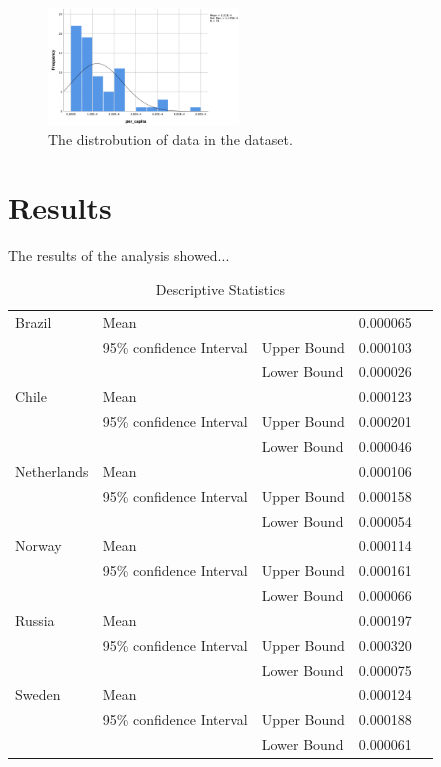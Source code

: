 \documentclass[conference]{IEEEtran}
\begin{document}
    \begin{figure}[h]
        \centering
        \includegraphics[width=0.45\textwidth]{skewed}
        \caption{The distrobution of data in the dataset.}
    \end{figure}

\section{Results}
The results of the analysis showed...
\newline

\begin{table}[ht]
    \centering
    \caption{Descriptive Statistics}
    \begin{tabular}{| l | l | lll |}
    \hline
     Brazil&  Mean&  &  0.000065&   \\
     &  95\% confidence Interval&  Upper Bound&  0.000103&   \\
     &  &  Lower Bound&  0.000026&   \\
     Chile&  Mean&  &  0.000123&   \\
     &  95\% confidence Interval&  Upper Bound&  0.000201&   \\
     &  &  Lower Bound&  0.000046&   \\
     Netherlands&  Mean&  &  0.000106&   \\
     &  95\% confidence Interval&  Upper Bound& 0.000158&   \\
     &  &  Lower Bound&  0.000054&   \\
     Norway&  Mean&  &  0.000114&   \\
     &  95\% confidence Interval&  Upper Bound&  0.000161&   \\
     &  &  Lower Bound&  0.000066&   \\
     Russia&  Mean&  &  0.000197&   \\
     &  95\% confidence Interval&  Upper Bound&  0.000320&   \\
     &  &  Lower Bound&  0.000075&   \\
     Sweden&  Mean&  &  0.000124&   \\
     &  95\% confidence Interval&  Upper Bound&  0.000188&   \\
     &  &  Lower Bound&  0.000061& \\\hline
    \end{tabular}
    \end{table}
\end{document}
